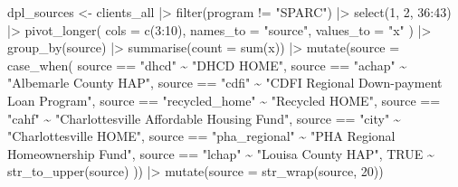 \documentclass[
  letterpaper,
  DIV=11,
  numbers=noendperiod]{scrartcl}
\newenvironment{Shaded}{\begin{snugshade}}{\end{snugshade}}
\newcommand{\AttributeTok}[1]{\textcolor[rgb]{0.40,0.45,0.13}{#1}}
\newcommand{\ConstantTok}[1]{\textcolor[rgb]{0.56,0.35,0.01}{#1}}
\newcommand{\DecValTok}[1]{\textcolor[rgb]{0.68,0.00,0.00}{#1}}
\newcommand{\FunctionTok}[1]{\textcolor[rgb]{0.28,0.35,0.67}{#1}}
\newcommand{\NormalTok}[1]{\textcolor[rgb]{0.00,0.23,0.31}{#1}}
\newcommand{\OtherTok}[1]{\textcolor[rgb]{0.00,0.23,0.31}{#1}}
\newcommand{\SpecialCharTok}[1]{\textcolor[rgb]{0.37,0.37,0.37}{#1}}
\newcommand{\StringTok}[1]{\textcolor[rgb]{0.13,0.47,0.30}{#1}}
\begin{document}
\begin{Shaded}
\begin{Highlighting}[]
\NormalTok{dpl\_sources }\OtherTok{\textless{}{-}}\NormalTok{ clients\_all }\SpecialCharTok{|\textgreater{}} 
  \FunctionTok{filter}\NormalTok{(program }\SpecialCharTok{!=} \StringTok{"SPARC"}\NormalTok{) }\SpecialCharTok{|\textgreater{}} 
  \FunctionTok{select}\NormalTok{(}\DecValTok{1}\NormalTok{, }\DecValTok{2}\NormalTok{, }\DecValTok{36}\SpecialCharTok{:}\DecValTok{43}\NormalTok{) }\SpecialCharTok{|\textgreater{}} 
  \FunctionTok{pivot\_longer}\NormalTok{(}
    \AttributeTok{cols =} \FunctionTok{c}\NormalTok{(}\DecValTok{3}\SpecialCharTok{:}\DecValTok{10}\NormalTok{),}
    \AttributeTok{names\_to =} \StringTok{"source"}\NormalTok{,}
    \AttributeTok{values\_to =} \StringTok{"x"}
\NormalTok{  ) }\SpecialCharTok{|\textgreater{}} 
  \FunctionTok{group\_by}\NormalTok{(source) }\SpecialCharTok{|\textgreater{}} 
  \FunctionTok{summarise}\NormalTok{(}\AttributeTok{count =} \FunctionTok{sum}\NormalTok{(x)) }\SpecialCharTok{|\textgreater{}} 
  \FunctionTok{mutate}\NormalTok{(}\AttributeTok{source =} \FunctionTok{case\_when}\NormalTok{(}
\NormalTok{    source }\SpecialCharTok{==} \StringTok{"dhcd"} \SpecialCharTok{\textasciitilde{}} \StringTok{"DHCD HOME"}\NormalTok{,}
\NormalTok{    source }\SpecialCharTok{==} \StringTok{"achap"} \SpecialCharTok{\textasciitilde{}} \StringTok{"Albemarle County HAP"}\NormalTok{,}
\NormalTok{    source }\SpecialCharTok{==} \StringTok{"cdfi"} \SpecialCharTok{\textasciitilde{}} \StringTok{"CDFI Regional Down{-}payment Loan Program"}\NormalTok{,}
\NormalTok{    source }\SpecialCharTok{==} \StringTok{"recycled\_home"} \SpecialCharTok{\textasciitilde{}} \StringTok{"Recycled HOME"}\NormalTok{,}
\NormalTok{    source }\SpecialCharTok{==} \StringTok{"cahf"} \SpecialCharTok{\textasciitilde{}} \StringTok{"Charlottesville Affordable Housing Fund"}\NormalTok{,}
\NormalTok{    source }\SpecialCharTok{==} \StringTok{"city"} \SpecialCharTok{\textasciitilde{}} \StringTok{"Charlottesville HOME"}\NormalTok{,}
\NormalTok{    source }\SpecialCharTok{==} \StringTok{"pha\_regional"} \SpecialCharTok{\textasciitilde{}} \StringTok{"PHA Regional Homeownership Fund"}\NormalTok{,}
\NormalTok{    source }\SpecialCharTok{==} \StringTok{"lchap"} \SpecialCharTok{\textasciitilde{}} \StringTok{"Louisa County HAP"}\NormalTok{,}
    \ConstantTok{TRUE} \SpecialCharTok{\textasciitilde{}} \FunctionTok{str\_to\_upper}\NormalTok{(source)}
\NormalTok{  )) }\SpecialCharTok{|\textgreater{}} 
  \FunctionTok{mutate}\NormalTok{(}\AttributeTok{source =} \FunctionTok{str\_wrap}\NormalTok{(source, }\DecValTok{20}\NormalTok{))}


\end{Highlighting}
\end{Shaded}
\end{document}
